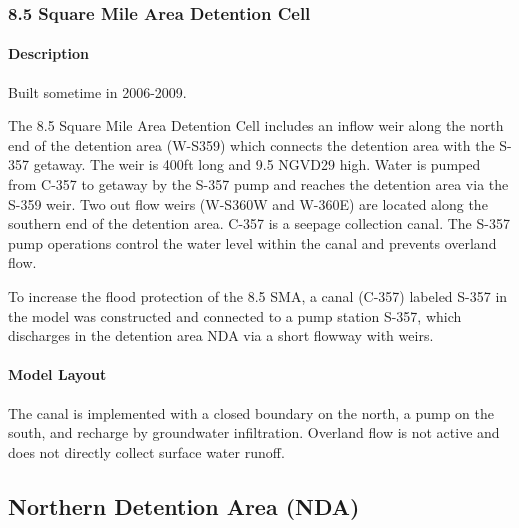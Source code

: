 \subsubsection{8.5 Square Mile Area Detention Cell}

\paragraph{Description}

Built sometime in 2006-2009.

The 8.5 Square Mile Area Detention Cell includes an inflow weir along the north end of the detention area (W-S359) which connects the detention area with the S-357 getaway. The weir is 400ft long and 9.5 NGVD29 high. Water is pumped from C-357 to getaway by the S-357 pump and reaches the detention area via the S-359 weir. Two out flow weirs (W-S360W and W-360E) are located along the southern end of the detention area. C-357 is a seepage collection canal. The S-357 pump operations control the water level within the canal and prevents overland flow.

To increase the flood protection of the 8.5 SMA, a canal (C-357) labeled S-357 in the model was constructed and connected to a pump station S-357, which discharges in the detention area NDA via a short flowway with weirs.


\paragraph{Model Layout}
The canal is implemented with a closed boundary on the north, a pump on the south, and recharge by groundwater infiltration. Overland flow is not active and does not directly collect surface water runoff.




\clearpage
\subsection{Northern Detention Area (NDA)}



